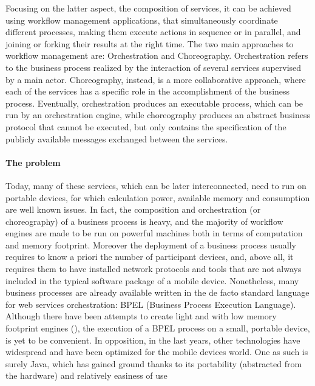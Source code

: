 Focusing on the latter aspect, the composition of services, it can be achieved using workflow management applications, that simultaneously coordinate different processes, making them execute actions in sequence or in parallel, and joining or forking their results at the right time. %
The two main approaches to workflow management are: Orchestration and Choreography.
Orchestration refers to the %
business process realized by the interaction of several services supervised by a main actor. Choreography, instead, is a more collaborative approach, where each of the services has a specific role in the accomplishment of the business process. Eventually, orchestration produces an executable process, which can be run by an orchestration engine, while choreography produces an abstract business protocol that cannot be executed, but only contains the specification of the publicly available messages exchanged between the services.

\paragraph{The problem}
Today, many of these services, which can be later interconnected, need to run on portable devices, for which calculation power, available memory and consumption are well known issues. In fact, the composition and orchestration (or choreography) of a business process is heavy, and the majority of workflow engines are made to be run on powerful machines both in terms of computation and memory footprint. Moreover the deployment of a business process usually requires to know a priori the number of participant devices, and, above all, it requires them to have installed network protocols and tools that are not always included in the typical software package of a mobile device. 
Nonetheless, many business processes are already available written in the de facto standard language for web services orchestration: BPEL (Business Process Execution Language). Although there have been attempts to create light and with low memory footprint engines (\cite{dddd}), the execution of a BPEL process on a small, portable device, is yet to be convenient.
In opposition, in the last years, other technologies have widespread and have been optimized for the mobile devices world. One as such is surely Java, which has gained ground thanks to its portability (abstracted from the hardware) and relatively easiness of use

